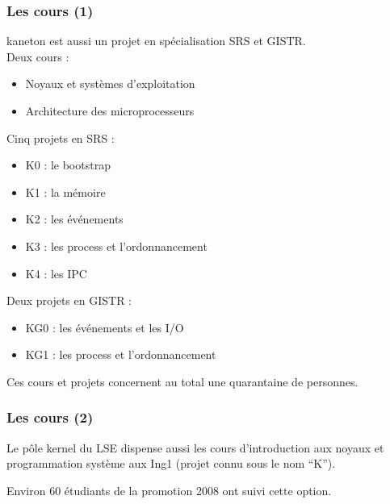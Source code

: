 
\begin{frame}
  \frametitle{Les cours (1)}

  kaneton est aussi un projet en sp\'{e}cialisation SRS et GISTR.\\

  Deux cours :

  \begin{itemize}
  \item
    Noyaux et syst\`{e}mes d'exploitation
  \item
    Architecture des microprocesseurs
  \end{itemize}

  \-

  Cinq projets en SRS :

  \begin{itemize}
  \item
    K0 : le bootstrap
  \item
    K1 : la m\'{e}moire
  \item
    K2 : les \'{e}v\'{e}nements
  \item
    K3 : les process et l'ordonnancement
  \item
    K4 : les IPC
  \end{itemize}

  \-

  Deux projets en GISTR :

  \begin{itemize}
  \item
    KG0 : les \'{e}v\'{e}nements et les I/O
  \item
    KG1 : les process et l'ordonnancement
  \end{itemize}

  \-

  Ces cours et projets concernent au total une quarantaine de
  personnes.

\end{frame}



\begin{frame}
  \frametitle{Les cours (2)}

  Le p\^{o}le kernel du LSE dispense aussi les cours d'introduction
  aux noyaux et programmation syst\`{e}me aux Ing1 (projet connu sous
  le nom ``K'').

  \-

  Environ 60 \'{e}tudiants de la promotion 2008 ont suivi cette option.

\end{frame}

